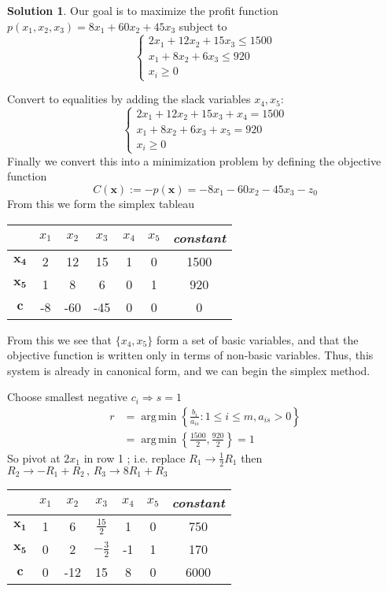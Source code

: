 \documentclass[11pt]{article}
\theoremstyle{plain}
\theoremstyle{definition}
\newtheorem*{soln*}{Solution}
\numberwithin{equation}{section}
\DeclareMathOperator*{\argmin}{arg\,min}
\begin{document}
\begin{soln*} 
    Our goal is to maximize the profit function $p(x_1, x_2, x_3) = 8 x_1 + 60 x_2 + 45 x_3$ subject to
    \[
         \begin{cases}
             2 x_1 + 12 x_2 + 15 x_3 \le 1500 \\
             x_1 + 8 x_2 + 6 x_3 \le 920 \\
        x_i \ge 0 \end{cases}
    \]

Convert to equalities by adding the slack variables $x_4, x_5$:
    \[
         \begin{cases}
             2 x_1 + 12 x_2 + 15 x_3 + x_4 = 1500 \\
             x_1 + 8 x_2 + 6 x_3 + x_5 = 920 \\
        x_i \ge 0 \end{cases}
    \]
Finally we convert this into a minimization problem by defining the objective function
\[
        C(\bm{x}) := -p(\bm{x}) = - 8 x_1 - 60 x_2 - 45 x_3 - z_0 
    \]
From this we form the simplex tableau
\begin{tabu}{c|c|c|c|c|c|c}
    ~ & $x_1$ & $x_2$ & $x_3$ & $x_4$ & $x_5$ & \textit{constant} \\
    \hline
    $\bm{x_4}$ & 2 & 12 & 15 & 1 & 0 & 1500 \\
    $\bm{x_5}$ & 1 & 8 & 6 & 0 & 1 & 920 \\
    $\bm{c}$   & -8 & -60 & -45 & 0 & 0 & 0
\end{tabu}

From this we see that $\{x_4, x_5\}$ form a set of basic variables, and that the objective function 
is written only in terms of non-basic variables. Thus, this system is already in canonical form,
and we can begin the simplex method.

Choose smallest negative $c_i \Rightarrow s = 1$
\begin{align*}
    r &= \argmin \left\{ \frac{b_i}{a_{is}} : 1 \le i \le m , a_{is} > 0 \right\}\\
      &= \argmin \left\{ \frac{1500}{2} , \frac{920}{2} \right\} = 1
\end{align*}
So pivot at $2x_1$ in row 1 ; i.e. replace $R_1 \to \frac{1}{2} R_1$ then
$R_2 \to -R_1 + R_2 \,,\, R_3 \to 8R_1 + R_3 $
\begin{center}
\begin{tabu}{c|c|c|c|c|c|c}
    ~ & $x_1$ & $x_2$ & $x_3$ & $x_4$ & $x_5$ & \textit{constant} \\
    \hline
    $\bm{x_1}$ & 1 & 6 & $\frac{15}{2}$ & 1 & 0 & 750 \\
    $\bm{x_5}$ & 0 & 2 & $-\frac{3}{2}$ & -1 & 1 & 170 \\
    $\bm{c}$   & 0 & -12 & 15 & 8 & 0 & 6000
\end{tabu}
\end{center}


\end{soln*}
\end{document}
